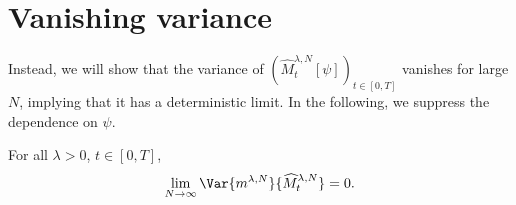 \section{Vanishing variance}

Instead, we will show that the variance of $(\widehat{M}_t^{\lambda,N}[\psi])_{t\in[0,T]}$ vanishes for large $N$, implying that it has a deterministic limit.
In the following, we suppress the dependence on $\psi$.

\begin{proposition}\label{prop:vanishing-variance}  %
  For all $\lambda > 0$, $t \in [0,T]$,
  \begin{equation}
    \lim_{N\to\infty} \Var{\lawmu^{\lambda,N}}{\widehat{M}_t^{\lambda,N}} = 0.
  \end{equation}
\end{proposition}
